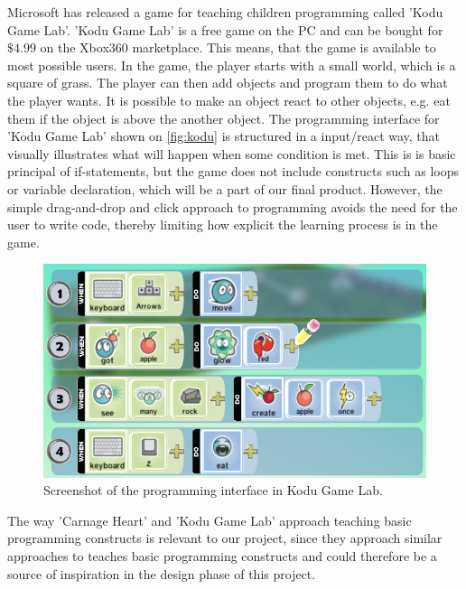 Microsoft has released a game for teaching children programming called 'Kodu Game Lab'.\cite{kodu}
'Kodu Game Lab' is a free game on the PC and can be bought for $\$4.99$ on the Xbox360 marketplace.
This means, that the game is available to most possible users.
In the game, the player starts with a small world, which is a square of grass.
The player can then add objects and program them to do what the player wants.
It is possible to make an object react to other objects, e.g. eat them if the object is above the another object.
The programming interface for 'Kodu Game Lab' shown on \autoref{fig:kodu} is structured in a input/react way, that visually illustrates what will happen when some condition is met. This is is basic principal of if-statements, but the game does not include constructs such as loops or variable declaration, which will be a part of our final product. However, the simple drag-and-drop and click approach to programming avoids the need for the user to write code, thereby limiting how explicit the learning process is in the game.

\begin{figure}[h]
  \centering
    \includegraphics[width=\textwidth]{img/kodu.png}
  \caption{Screenshot of the programming interface in Kodu Game Lab.}
  \label{fig:kodu}
\end{figure}

The way 'Carnage Heart' and 'Kodu Game Lab' approach teaching basic programming constructs is relevant to our project, since they approach similar approaches to teaches basic programming constructs and could therefore be a source of inspiration in the design phase of this project.